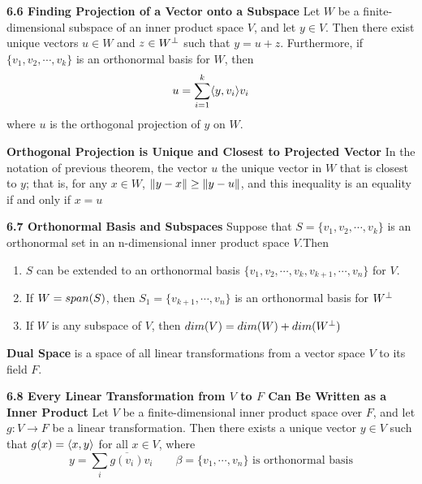 \documentclass[11pt]{article}
\begin{document}
\begin{theorem*}
    \textbf{6.6 Finding Projection of a Vector onto a Subspace} Let $W$ be a finite-dimensional subspace of an inner product space $V$, and let $y\in V$. Then there exist unique vectors $u\in W$ and $z\in W^{\perp}$ such that $y=u+z$. Furthermore, if $\{v_1,v_2,\cdots,v_k\}$ is an orthonormal basis for $W$, then 
    \[
        u = \sum_{i=1}^k \langle y,v_i\rangle v_i    
    \]
    where $u$ is the orthogonal projection of $y$ on $W$.
\end{theorem*}


\begin{corollary*}
    \textbf{Orthogonal Projection is Unique and Closest to Projected Vector} In the notation of previous theorem, the vector $u$ the unique vector in $W$ that is closest to $y$; that is, for any $x\in W$, $\left\lVert y-x\right\rVert \geq \left\lVert y-u\right\rVert$, and this inequality is an equality if and only if $x=u$
\end{corollary*}


\begin{theorem*}
    \textbf{6.7 Orthonormal Basis and Subspaces} Suppose that $S = \{v_1,v_2,\cdots, v_k\}$ is an orthonormal set in an n-dimensional inner product space $V$.Then 
    \begin{enumerate}
        \item $S$ can be extended to an orthonormal basis $\{v_1,v_2,\cdots, v_k, v_{k+1}, \cdots, v_n\}$ for $V$. 
        \item If $W = span(S)$, then $S_1 = \{v_{k+1}, \cdots, v_n\}$ is an orthonormal basis for $W^{\perp}$ 
        \item If $W$ is any subspace of $V$, then $dim(V) = dim(W) + dim(W^{\perp})$
    \end{enumerate}
\end{theorem*}


\begin{defn*}
    \textbf{Dual Space} is a space of all linear transformations from a vector space $V$ to its field $F$. 
\end{defn*}

\begin{theorem*}
    \textbf{6.8 Every Linear Transformation from $V$ to $F$ Can Be Written as a Inner Product} Let $V$ be a finite-dimensional inner product space over $F$, and let $g: V\to F$ be a linear transformation. Then there exists a unique vector $y\in V$ such that $g(x) = \langle x,y\rangle$ for all $x\in V$, where
    \[
        y = \sum_i \overline{g(v_i)} v_i \qquad \text{$\beta = \{ v_1,\cdots , v_n \}$ is orthonormal basis}
    \]
\end{theorem*}
\end{document}
